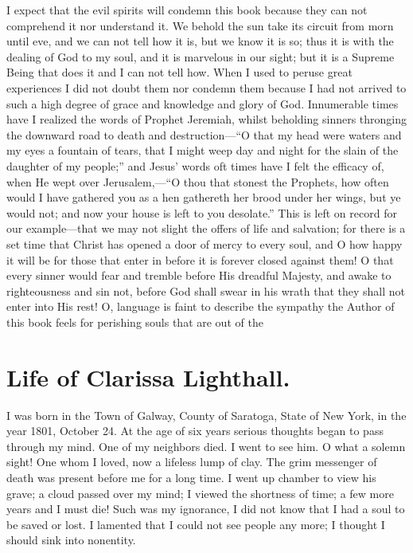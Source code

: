 \documentclass{article}
\begin{document}
I expect that the evil spirits will condemn this book because they can not comprehend it nor understand it.
We behold the sun take its circuit from morn until eve, and we can not tell how it is, but we know it is so; thus it is with the dealing of God to my soul, and it is marvelous in our sight; but it is a Supreme Being that does it and I can not tell how.
When I used to peruse great experiences I did not doubt them nor condemn them because I had not arrived to such a high degree of grace and knowledge and glory of God.
Innumerable times have I realized the words of Prophet Jeremiah, whilst beholding sinners thronging the downward road to death and destruction---``O that my head were waters and my eyes a fountain of tears, that I might weep day and night for the slain of the daughter of my people;'' and Jesus' words oft times have I felt the efficacy of, when He wept over Jerusalem,---``O thou that stonest the Prophets, how often would I have gathered you as a hen gathereth her brood under her wings, but ye would not; and now your house is left to you desolate.''
This is left on record for our example---that we may not slight the offers of life and salvation; for there is a set time that Christ has opened a door of mercy to every soul, and O how happy it will be for those that enter in before it is forever closed against them!
O that every sinner would fear and tremble before His dreadful Majesty, and awake to righteousness and sin not, before God shall swear in his wrath that they shall not enter into His rest!
O, language is faint to describe the sympathy the Author of this book feels for perishing souls that are out of the 

\section*{Life of Clarissa Lighthall.}
I was born in the Town of Galway, County of Saratoga, State of New York, in the year 1801, October 24.
At the age of six years serious thoughts began to pass through my mind.
One of my neighbors died.
I went to see him.
O what a solemn sight!
One whom I loved, now a lifeless lump of clay.
The grim messenger of death was present before me for a long time.
I went up chamber to view his grave; a cloud passed over my mind; I viewed the shortness of time; a few more years and I must die!
Such was my ignorance, I did not know that I had a soul to be saved or lost.
I lamented that I could not see people any more; I thought I should sink into nonentity.
\end{document}
